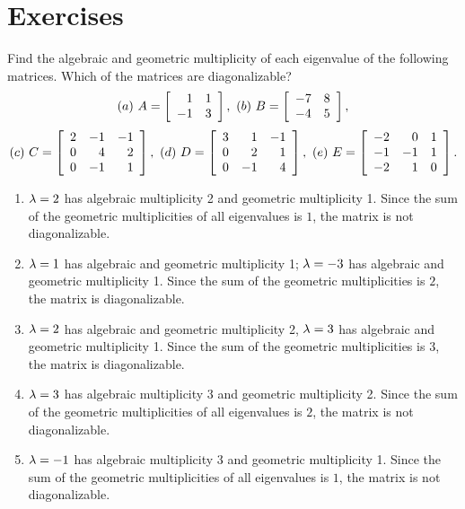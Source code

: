 \documentclass{ximera}
\author{Zack Reed}
\begin{document}
\section*{Exercises}

\begin{exercise}
  Find the algebraic and geometric multiplicity of each eigenvalue of
  the following matrices. Which of the matrices are diagonalizable?
  \begin{equation*}
    (a)\quad
    A = \startmat{rr} 1 & 1 \\ -1 & 3 \stopmat,
    \quad
    (b)\quad
    B = \startmat{rr} -7 & 8 \\ -4 & 5 \stopmat,
  \end{equation*}
  \begin{equation*}
    (c)\quad
    C = \startmat{rrr}
      2 & -1 & -1 \\
      0 & 4 & 2 \\
      0 & -1 & 1 \\
    \stopmat,
    \quad
    (d)\quad
    D = \startmat{rrr}
      3 & 1 & -1 \\
      0 & 2 & 1 \\
      0 & -1 & 4 \\
    \stopmat,
    \quad
    (e)\quad
    E = \startmat{rrr}
      -2 & 0 & 1 \\
      -1 & -1 & 1 \\
      -2 & 1 & 0 \\
    \stopmat.
  \end{equation*}
  \begin{solution}
    \begin{enumerate}
    \item $\eigenvar=2$ has algebraic multiplicity 2 and geometric
      multiplicity 1. Since the sum of the geometric multiplicities of
      all eigenvalues is $1$, the matrix is not diagonalizable.
    \item $\eigenvar=1$ has algebraic and geometric
      multiplicity 1; $\eigenvar=-3$ has algebraic and geometric
      multiplicity 1. Since the sum of the geometric multiplicities is
      $2$, the matrix is diagonalizable.
    \item $\eigenvar=2$ has algebraic and geometric
      multiplicity 2, $\eigenvar=3$ has algebraic and geometric
      multiplicity 1. Since the sum of the geometric multiplicities is
      $3$, the matrix is diagonalizable.
    \item $\eigenvar=3$ has algebraic multiplicity 3 and geometric
      multiplicity 2. Since the sum of the geometric multiplicities of
      all eigenvalues is $2$, the matrix is not diagonalizable.
    \item $\eigenvar = -1$ has algebraic multiplicity 3 and geometric
      multiplicity 1. Since the sum of the geometric multiplicities of
      all eigenvalues is $1$, the matrix is not diagonalizable.
    \end{enumerate}
  \end{solution}
\end{exercise}
\end{document}

